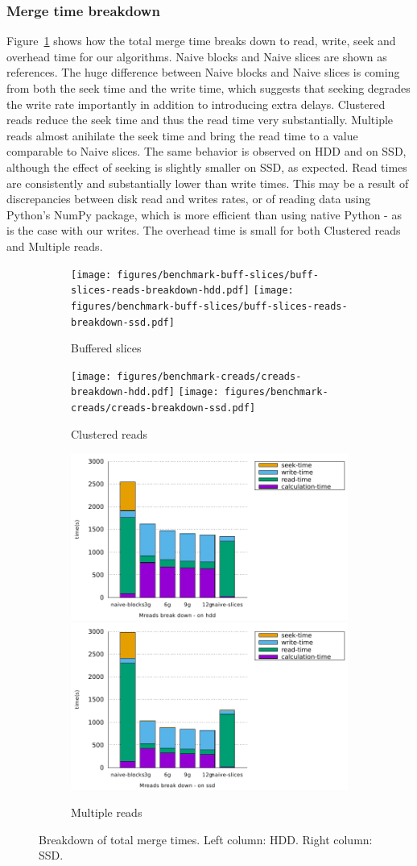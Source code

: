 \documentclass[10pt, conference, compsocconf]{IEEEtran}
\begin{document}
\subsubsection{Merge time breakdown}
Figure~\ref{fig:breakdowns-ssd} shows how the total merge time breaks
down to read, write, seek and overhead time for our algorithms. Naive
blocks and Naive slices are shown as references. The huge difference
between Naive blocks and Naive slices is coming from both the seek
time and the write time, which suggests that seeking degrades the
write rate importantly in addition to introducing extra delays.
Clustered reads reduce the seek time and thus the read time very
substantially. Multiple reads almost anihilate the seek time and bring
the read time to a value comparable to Naive slices.  The same
behavior is observed on HDD and on SSD, although the effect of seeking
is slightly smaller on SSD, as expected. Read times are consistently
and substantially lower than write times. This may be a result of
discrepancies between disk read and writes rates, or of reading data using Python's NumPy
package, which is more efficient than using native Python - as is the
case with our writes. The overhead time is small for both Clustered
reads and Multiple reads.
\begin{figure}
  \begin{subfigure}[b]{\columnwidth}
    \texttt{[image: figures/benchmark-buff-slices/buff-slices-reads-breakdown-hdd.pdf]}
    \texttt{[image: figures/benchmark-buff-slices/buff-slices-reads-breakdown-ssd.pdf]}
    \caption{Buffered slices}
  \end{subfigure}
  \begin{subfigure}[b]{\columnwidth}
    \texttt{[image: figures/benchmark-creads/creads-breakdown-hdd.pdf]}
    \texttt{[image: figures/benchmark-creads/creads-breakdown-ssd.pdf]}
    \caption{Clustered reads}
  \end{subfigure}
  \begin{subfigure}[b]{\columnwidth}
    \includegraphics[width=0.45\columnwidth]{figures/benchmark-mreads/mreads-breakdown-hdd.pdf}
    \includegraphics[width=0.45\columnwidth]{figures/benchmark-mreads/mreads-breakdown-ssd.pdf}
    \caption{Multiple reads}
  \end{subfigure}
  \caption{Breakdown of total merge times. Left column: HDD. Right column: SSD.}
  \label{fig:breakdowns-ssd}
\end{figure}
\end{document}
